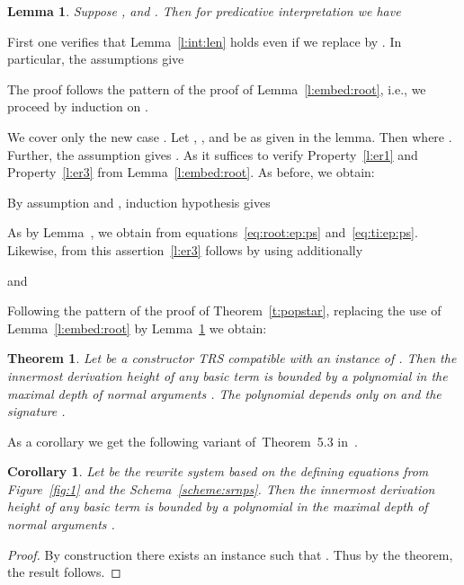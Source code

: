 \documentclass{LMCS}
\newtheorem{theorem}[thm]{Theorem}
\newtheorem{lemma}[thm]{Lemma}
\newtheorem{corollary}[thm]{Corollary}
\begin{document}
\begin{lemma}\label{l:embed:root:ps}
  Suppose ,  and . 
  Then for predicative interpretation 
  we have 
  
\end{lemma}
\proof
  First one verifies that 
  Lemma~\ref{l:int:len} holds even if we replace 
   by . 
  In particular, the assumptions give 
  
The proof follows the pattern of the proof of Lemma~\ref{l:embed:root}, i.e.,
  we proceed by induction on . 

  We cover only the new case .
  Let , , and  be as given in the lemma.
    Then  where .
    Further, the assumption gives
    .
    As  
    it suffices to verify Property~\ref{l:er1} and Property~\ref{l:er3}
    from Lemma~\ref{l:embed:root}.
    As before, we obtain:
    
By assumption  and , induction hypothesis gives 
    
    As  by Lemma~, 
    we obtain 
    from equations~\eqref{eq:root:ep:ps} and~\eqref{eq:ti:ep:ps}.
Likewise, from this assertion~\ref{l:er3} follows by  using additionally 
    
    and
    \vspace{-3 pt}



\noindent Following the pattern of the proof of Theorem~\ref{t:popstar}, replacing
the use of Lemma~\ref{l:embed:root} by Lemma~\ref{l:embed:root:ps} we obtain:
\begin{theorem}\label{t:popstarps}
  Let  be a constructor TRS compatible with an instance of .
Then the innermost derivation height of any basic term 
   is bounded by a polynomial in the 
  maximal depth of normal arguments .
  The polynomial depends only on  and the signature .
\end{theorem}

As a corollary we get the following variant of~Theorem~5.3 in~\cite{BW96}.
\begin{corollary}
Let  be the rewrite system based on the defining equations from Figure~\ref{fig:1} 
and the Schema~\eqref{scheme:srnps}. Then 
the innermost derivation height of any basic term  
is bounded by a polynomial in the maximal depth of normal arguments .
\end{corollary}
\begin{proof}
By construction there exists an instance  such that .
Thus by the theorem, the result follows.  
\end{proof}
\end{document}
